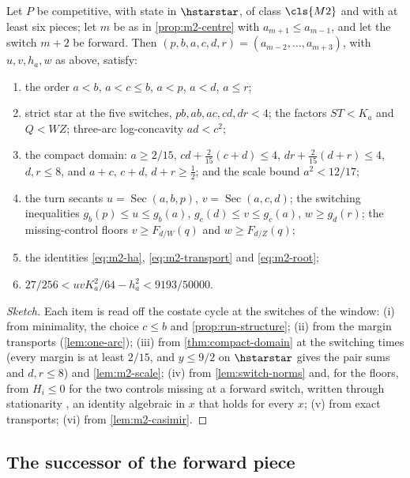 \begin{proposition}\label{prop:m2-window}
Let $P$ be competitive, with state in $\hstarstar$, of class $\cls{M2}$ and with at least six pieces;
let $m$ be as in \cref{prop:m2-centre} with $a_{m+1}\le a_{m-1}$, and let the switch $m+2$ be
forward. Then $(p,b,a,c,d,r)=(a_{m-2},\dots,a_{m+3})$, with $u,v,h_a,w$ as above, satisfy:
\begin{enumerate}[label=(\roman*)]
\item the order $a<b$, $a<c\le b$, $a<p$, $a<d$, $a\le r$;
\item strict star at the five switches, $pb,ab,ac,cd,dr<4$; the factors $ST<K_a$ and $Q<WZ$;
three-arc log-concavity $ad<c^2$;
\item the compact domain: $a\ge2/15$, $cd+\frac2{15}(c+d)\le4$, $dr+\frac2{15}(d+r)\le4$,
$d,r\le8$, and $a+c,\,c+d,\,d+r\ge\frac12$; and the scale bound $a^2<12/17$;
\item the turn secants $u=\operatorname{Sec}(a,b,p)$, $v=\operatorname{Sec}(a,c,d)$; the switching
inequalities $g_b(p)\le u\le g_b(a)$, $g_c(d)\le v\le g_c(a)$, $w\ge g_d(r)$; the missing-control
floors $v\ge F_{d/W}(q)$ and $w\ge F_{d/Z}(q)$;
\item the identities \eqref{eq:m2-ha}, \eqref{eq:m2-transport} and \eqref{eq:m2-root};
\item $27/256<uvK_a^2/64-h_a^2<9193/50000$.
\end{enumerate}
\end{proposition}

\begin{proof}[Sketch]
Each item is read off the costate cycle at the switches of the window: (i) from minimality, the
choice $c\le b$ and \cref{prop:run-structure}; (ii) from the margin transports (\cref{lem:one-arc});
(iii) from \cref{thm:compact-domain} at the switching times (every margin is at least $2/15$, and
$y\le9/2$ on $\hstarstar$ gives the pair sums and $d,r\le8$) and \cref{lem:m2-scale}; (iv) from
\cref{lem:switch-norms} and, for the floors, from $H_i\le0$ for the two controls missing at a forward
switch, written through stationarity
\cite[\texttt{MIXED\_\allowbreak GLOBAL\_\allowbreak SMALL\_\allowbreak FORWARD\_\allowbreak MINIMUM}~(11)--(12)]{Notes}, an identity algebraic in
$x$ that holds for every $x$; (v) from exact transports; (vi) from \cref{lem:m2-casimir}.
\end{proof}

\subsection{The successor of the forward piece}\label{sec:m2-continuation}

